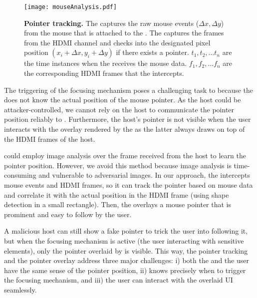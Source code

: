 \begin{figure}[t]
\centering
\texttt{[image: mouseAnalysis.pdf]}
\caption{\textbf{Pointer tracking.} \one The \device captures the raw mouse events ($\Delta x, \Delta y$) from the mouse that is attached to the \device. \two The \device captures the frames from the HDMI channel and checks into the designated pixel position $(x_i + \Delta x, y_i + \Delta y)$ if there exists a pointer. $t_1, t_2,\ldots t_n$ are the time instances when the \device receives the mouse data. $f_1, f_2,\ldots f_n$ are the corresponding HDMI frames that the \device intercepts.}
\spacesave
\label{fig:mouseAnalysis}
\centering
\end{figure}

The triggering of the focusing mechanism poses a challenging task to \name because the \device does not know the actual position of the mouse pointer. As the host could be attacker-controlled, we cannot rely on the host to communicate the pointer position reliably to \device. Furthermore, the host's pointer is not visible when the user interacts with the overlay rendered by the \device as the latter always draws on top of the HDMI frames of the host. 

\device could employ image analysis over the frame received from the host to learn the pointer position. However, we avoid this method because image analysis is time-consuming and vulnerable to adversarial images. In our approach, the \device intercepts mouse events and HDMI frames, so it can track the pointer based on mouse data and correlate it with the actual position in the HDMI frame (using shape detection in a small rectangle). Then, the \device overlays a mouse pointer that is prominent and easy to follow by the user. 

A malicious host can still show a fake pointer to trick the user into following it, but when the focusing mechanism is active (the user interacting with sensitive elements), only the pointer overlaid by \device is visible. This way, the pointer tracking and the pointer overlay address three major challenges: i) both the \device and the user have the same sense of the pointer position, ii) \device knows precisely when to trigger the focusing mechanism, and iii) the user can interact with the overlaid UI seamlessly. 


